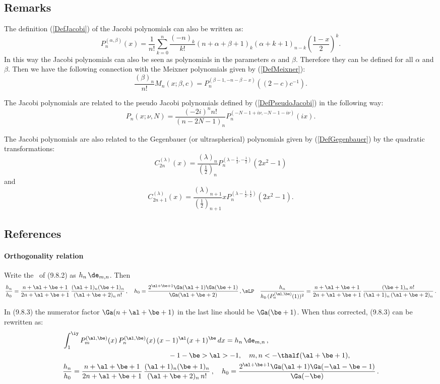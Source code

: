\documentclass[envcountchap,graybox]{svmono}
\begin{document}
\subsection*{Remarks}
The definition (\ref{DefJacobi}) of the Jacobi polynomials can also be written as:
$$P_n^{(\alpha,\beta)}(x)=\frac{1}{n!}\sum_{k=0}^n\frac{(-n)_k}{k!}
(n+\alpha+\beta+1)_k(\alpha+k+1)_{n-k}\left(\frac{1-x}{2}\right)^k.$$
In this way the Jacobi polynomials can also be seen as polynomials in the parameters $\alpha$
and $\beta$. Therefore they can be defined for all $\alpha$ and $\beta$. Then we have the
following connection with the Meixner polynomials given by (\ref{DefMeixner}):
$$\frac{(\beta)_n}{n!}M_n(x;\beta,c)=P_n^{(\beta-1,-n-\beta-x)}((2-c)c^{-1}).$$

\noindent
The Jacobi polynomials are related to the pseudo Jacobi polynomials defined by
(\ref{DefPseudoJacobi}) in the following way:
$$P_n(x;\nu,N)=\frac{(-2i)^nn!}{(n-2N-1)_n}P_n^{(-N-1+i\nu,-N-1-i\nu)}(ix).$$

\noindent
The Jacobi polynomials are also related to the Gegenbauer (or ultraspherical) polynomials
given by (\ref{DefGegenbauer}) by the quadratic transformations:
$$C_{2n}^{(\lambda)}(x)=\frac{(\lambda)_n}{(\frac{1}{2})_n}
P_n^{(\lambda-\frac{1}{2},-\frac{1}{2})}(2x^2-1)$$
and
$$C_{2n+1}^{(\lambda)}(x)=\frac{(\lambda)_{n+1}}{(\frac{1}{2})_{n+1}}
xP_n^{(\lambda-\frac{1}{2},\frac{1}{2})}(2x^2-1).$$

\subsection*{References}
\label{sec9.8}
%
\paragraph{Orthogonality relation}
Write the \RHS\ of (9.8.2) as $h_n\,\de_{m,n}$. Then
\begin{equation}
\begin{split}
&\frac{h_n}{h_0}=
\frac{n+\al+\be+1}{2n+\al+\be+1}\,
\frac{(\al+1)_n(\be+1)_n}{(\al+\be+2)_n\,n!}\,,\quad
h_0=\frac{2^{\al+\be+1}\Ga(\al+1)\Ga(\be+1)}{\Ga(\al+\be+2)}\,,\sLP
&\frac{h_n}{h_0\,(P_n^{(\al,\be)}(1))^2}=
\frac{n+\al+\be+1}{2n+\al+\be+1}\,
\frac{(\be+1)_n\,n!}{(\al+1)_n\,(\al+\be+2)_n}\,.
\end{split}
\label{60}
\end{equation}

In (9.8.3) the numerator factor $\Ga(n+\al+\be+1)$ in the last line should be
$\Ga(\be+1)$. When thus corrected, (9.8.3) can be rewritten as:
\begin{equation}
\begin{split}
&\int_1^\iy P_m^{(\al,\be)}(x)\,P_n^{(\al,\be)}(x)\,(x-1)^\al (x+1)^\be\,dx=h_n\,\de_{m,n}\,,\\
&\qquad\qquad\qquad\qquad\qquad\qquad\qquad\quad-1-\be>\al>-1,\quad m,n<-\thalf(\al+\be+1),\\
&\frac{h_n}{h_0}=
\frac{n+\al+\be+1}{2n+\al+\be+1}\,
\frac{(\al+1)_n(\be+1)_n}{(\al+\be+2)_n\,n!}\,,\quad
h_0=\frac{2^{\al+\be+1}\Ga(\al+1)\Ga(-\al-\be-1)}{\Ga(-\be)}\,.
\end{split}
\label{122}
\end{equation}
\end{document}
